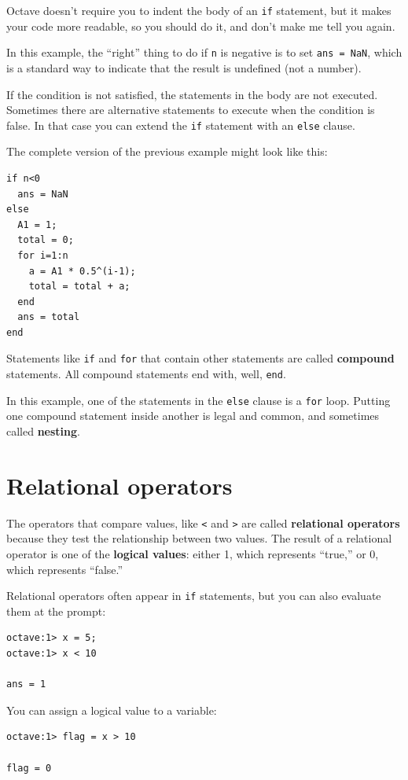 \documentclass{book}
\begin{document}
Octave doesn't require you to indent the body of an {\tt if}
statement, but it makes your code more readable, so you should do it,
and don't make me tell you again.

In this example, the ``right'' thing to do if {\tt n} is negative
is to set {\tt ans = NaN}, which is a standard way to indicate that
the result is undefined (not a number).

If the condition is not satisfied, the statements in the body are
not executed. Sometimes there are alternative statements to
execute when the condition is false. In that case you can extend
the {\tt if} statement with an {\tt else} clause.

The complete version of the previous example might look like this:

\begin{verbatim}
if n<0
  ans = NaN
else
  A1 = 1;
  total = 0;
  for i=1:n
    a = A1 * 0.5^(i-1);
    total = total + a;
  end
  ans = total
end
\end{verbatim}

Statements like {\tt if} and {\tt for} that contain other statements
are called {\bf compound} statements. All compound statements end
with, well, {\tt end}.

In this example, one of the statements in the {\tt else} clause is a
{\tt for} loop. Putting one compound statement inside another is
legal and common, and sometimes called {\bf nesting}.


\section{Relational operators}

The operators that compare values, like {\tt <} and {\tt >} are
called {\bf relational operators} because they test the relationship
between two values. The result of a relational operator is one
of the {\bf logical values}:
either 1, which represents ``true,'' or 0, which represents ``false.''

Relational operators often appear in {\tt if} statements, but you
can also evaluate them at the prompt:

\begin{verbatim}
octave:1> x = 5;
octave:1> x < 10

ans = 1
\end{verbatim}

You can assign a logical value to a variable:

\begin{verbatim}
octave:1> flag = x > 10

flag = 0
\end{verbatim}
\end{document}
